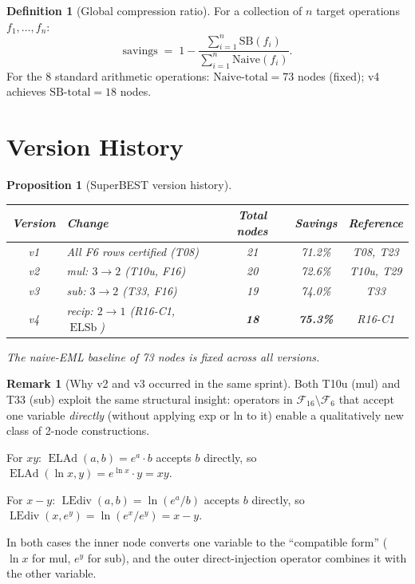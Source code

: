 \documentclass[12pt,a4paper]{article}
\newtheorem{proposition}[theorem]{Proposition}
\theoremstyle{definition}
\newtheorem{definition}[theorem]{Definition}
\newtheorem{remark}[theorem]{Remark}
\newcommand{\ELAd}{\operatorname{ELAd}}
\newcommand{\ELSb}{\operatorname{ELSb}}
\newcommand{\LEdiv}{\operatorname{LEdiv}}
\begin{document}
\begin{definition}[Global compression ratio]\label{def:ratio}
For a collection of $n$ target operations $f_1,\ldots,f_n$:
\[
  \mathrm{savings} \;=\; 1 - \frac{\sum_{i=1}^n \mathrm{SB}(f_i)}{\sum_{i=1}^n \mathrm{Naive}(f_i)}.
\]
For the 8 standard arithmetic operations:
$\mathrm{Naive\text{-}total} = 73$ nodes (fixed); v4 achieves
$\mathrm{SB\text{-}total} = 18$ nodes.
\end{definition}

\section{Version History}

\begin{proposition}[SuperBEST version history]\label{prop:history}
~

\begin{center}
\begin{tabular}{@{}clccc@{}}
\toprule
\textbf{Version} & \textbf{Change} & \textbf{Total nodes} & \textbf{Savings} & \textbf{Reference} \\
\midrule
v1 & All F6 rows certified (T08) & 21 & 71.2\% & T08, T23 \\
v2 & mul: $3\to2$ (T10u, F16) & 20 & 72.6\% & T10u, T29 \\
v3 & sub: $3\to2$ (T33, F16) & 19 & 74.0\% & T33 \\
v4 & recip: $2\to1$ (R16-C1, $\ELSb$) & \textbf{18} & \textbf{75.3\%} & R16-C1 \\
\bottomrule
\end{tabular}
\end{center}

The naive-EML baseline of 73 nodes is fixed across all versions.
\end{proposition}

\begin{remark}[Why v2 and v3 occurred in the same sprint]\label{rem:sprint}
Both T10u (mul) and T33 (sub) exploit the same structural insight: operators
in $\mathcal{F}_{16}\setminus\mathcal{F}_6$ that accept one variable
\emph{directly} (without applying exp or ln to it) enable a qualitatively
new class of 2-node constructions.

For $xy$: $\ELAd(a,b)=e^a\cdot b$ accepts $b$ directly, so
$\ELAd(\ln x, y) = e^{\ln x}\cdot y = xy$.

For $x-y$: $\LEdiv(a,b)=\ln(e^a/b)$ accepts $b$ directly, so
$\LEdiv(x, e^y) = \ln(e^x/e^y) = x-y$.

In both cases the inner node converts one variable to the ``compatible form''
($\ln x$ for mul, $e^y$ for sub), and the outer direct-injection operator
combines it with the other variable.
\end{remark}
\end{document}
